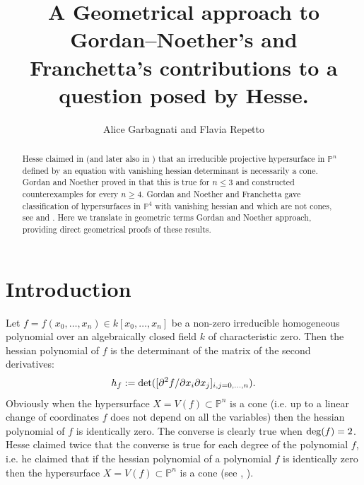 \documentclass[11pt,a4paper]{amsart}
\newcommand{\PP}{ \mathbb{P}}
\begin{document}

\title{A Geometrical approach to Gordan--Noether's and Franchetta's contributions to a question posed by Hesse.}
\author{Alice Garbagnati and Flavia Repetto}
\address{Alice Garbagnati, Dipartimento di Matematica, Universit\`a di Milano,
  via Saldini 50, I-20133 Milano, Italia}


\address{Flavia Repetto, Dipartimento di Matematica, Universit\`a di Milano,
  via Saldini 50, I-20133 Milano, Italia}



\maketitle {}




\begin{abstract}
Hesse claimed in \cite{Hesse1} (and later also in \cite{Hesse2}) that an irreducible
projective hypersurface in $\PP^n$ defined by an equation with vanishing hessian determinant
is necessarily a cone. Gordan and Noether proved in \cite{Gordan Noether} that this is true
for $n\leq 3$ and constructed counterexamples for every $n\geq 4$. Gordan and Noether
 and Franchetta  gave classification of hypersurfaces
in $\PP^4$ with vanishing hessian and which are not cones, see
\cite{Gordan Noether} and \cite{Franchetta}. Here we translate in
geometric terms Gordan and Noether approach, providing direct
geometrical proofs of these results.
\end{abstract}


\section{Introduction}
Let $f=f(x_0, \ldots, x_n)\in k[x_0, \ldots, x_n]$ be a non-zero
irreducible homogeneous polynomial  over an algebraically closed
field $k$ of characteristic zero. Then the hessian polynomial of
$f$ is the determinant of the matrix of the second derivatives:
 $$h_f:={\rm det} ([\partial^2
f/\partial x_i\partial x_j]_{i,j=0,\ldots ,n}).$$ Obviously when
the hypersurface $X=V(f)\subset\mathbb{P}^n$ is a cone (i.e. up
to a linear change of coordinates $f$ does not depend on all the
variables) then the hessian polynomial of $f$ is identically zero.
The converse is clearly true when ${\rm deg}(f)=2$.
Hesse claimed twice that the converse is true for
each degree of the polynomial $f$, i.e. he claimed that if the
hessian polynomial of a polynomial $f$ is identically zero then
the hypersurface $X=V(f)\subset\mathbb{P}^n$ is a cone (see
\cite{Hesse1}, \cite{Hesse2}).
\end{document}
